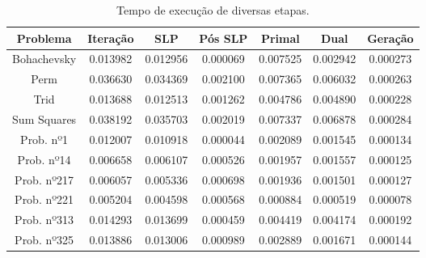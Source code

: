 {
  \begin{table}[H]
    \begin{center}
      \vspace{6pt}
      \caption{Tempo de execução de diversas etapas.\label{qua:tempo-etapas}}
      \vspace{6pt}
      \begin{small}
        \begin{tabular}{||c|c|c|c|c|c|c||}
          \hline
          Problema & Iteração & SLP & Pós SLP & Primal & Dual & Geração \\ [0.5ex] 
          \hline\hline

          Bohachevsky & 0.013982 & 0.012956 & 0.000069 & 0.007525 & 0.002942 & 0.000273 \\
          \hline
          Perm        & 0.036630 & 0.034369 & 0.002100 & 0.007365 & 0.006032 & 0.000263 \\
          \hline
          Trid        & 0.013688 & 0.012513 & 0.001262 & 0.004786 & 0.004890 & 0.000228 \\
          \hline
          Sum Squares & 0.038192 & 0.035703 & 0.002019 & 0.007337 & 0.006878 & 0.000284 \\
          \hline
          Prob. nº1   & 0.012007 & 0.010918 & 0.000044 & 0.002089 & 0.001545 & 0.000134 \\
          \hline
          Prob. nº14  & 0.006658 & 0.006107 & 0.000526 & 0.001957 & 0.001557 & 0.000125 \\
          \hline
          Prob. nº217 & 0.006057 & 0.005336 & 0.000698 & 0.001936 & 0.001501 & 0.000127 \\
          \hline
          Prob. nº221 & 0.005204 & 0.004598 & 0.000568 & 0.000884 & 0.000519 & 0.000078 \\
          \hline
          Prob. nº313 & 0.014293 & 0.013699 & 0.000459 & 0.004419 & 0.004174 & 0.000192 \\
          \hline
          Prob. nº325 & 0.013886 & 0.013006 & 0.000989 & 0.002889 & 0.001671 & 0.000144 \\
          \hline

        \end{tabular}
      \end{small}
    \end{center}
  \end{table}
}


